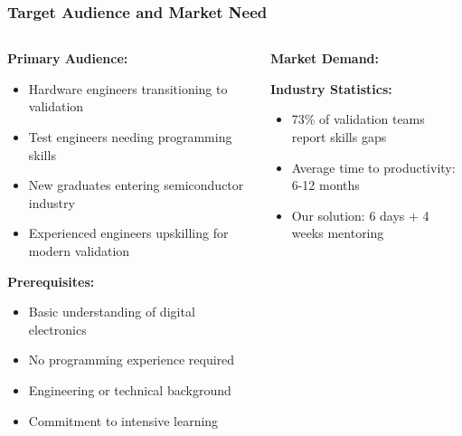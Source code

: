 \documentclass{beamer}
\begin{document}
\begin{frame}
\frametitle{Target Audience and Market Need}

\begin{columns}
\begin{column}{0.5\textwidth}
\textbf{Primary Audience:}
\begin{itemize}
    \item Hardware engineers transitioning to validation
    \item Test engineers needing programming skills
    \item New graduates entering semiconductor industry
    \item Experienced engineers upskilling for modern validation
\end{itemize}

\vspace{0.5cm}
\textbf{Prerequisites:}
\begin{itemize}
    \item Basic understanding of digital electronics
    \item No programming experience required
    \item Engineering or technical background
    \item Commitment to intensive learning
\end{itemize}
\end{column}
\begin{column}{0.5\textwidth}
\textbf{Market Demand:}
\begin{center}
\end{center}

\textbf{Industry Statistics:}
\begin{itemize}
    \item 73\% of validation teams report skills gaps
    \item Average time to productivity: 6-12 months
    \item Our solution: 6 days + 4 weeks mentoring
\end{itemize}
\end{column}
\end{columns}
\end{frame}
\end{document}
